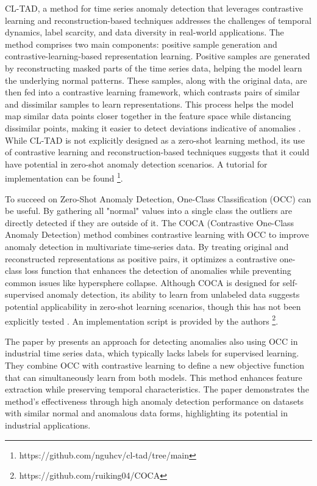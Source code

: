 CL-TAD, a method for time series anomaly detection that leverages contrastive learning and reconstruction-based techniques addresses the challenges of temporal dynamics, label scarcity, and data diversity in real-world applications. The method comprises two main components: positive sample generation and contrastive-learning-based representation learning. Positive samples are generated by reconstructing masked parts of the time series data, helping the model learn the underlying normal patterns. These samples, along with the original data, are then fed into a contrastive learning framework, which contrasts pairs of similar and dissimilar samples to learn representations. This process helps the model map similar data points closer together in the feature space while distancing dissimilar points, making it easier to detect deviations indicative of anomalies \cite{ngu_cl-tad_2023}.
While CL-TAD is not explicitly designed as a zero-shot learning method, its use of contrastive learning and reconstruction-based techniques suggests that it could have potential in zero-shot anomaly detection scenarios. A tutorial for implementation can be found \footnote{\fussy\tiny https://github.com/nguhcv/cl-tad/tree/main}.

To succeed on Zero-Shot Anomaly Detection, One-Class Classification (OCC) can be useful.
By gathering all "normal" values into a single class the outliers are directly detected if they are outside of it.
The COCA (Contrastive One-Class Anomaly Detection) method combines contrastive learning with OCC to improve anomaly detection in multivariate time-series data. By treating original and reconstructed representations as positive pairs, it optimizes a contrastive one-class loss function that enhances the detection of anomalies while preventing common issues like hypersphere collapse. Although COCA is designed for self-supervised anomaly detection, its ability to learn from unlabeled data suggests potential applicability in zero-shot learning scenarios, though this has not been explicitly tested \cite{wang_deep_2023}. An implementation script is provided by the authors \footnote{\fussy\tiny https://github.com/ruiking04/COCA}.

%
The paper by \cite{lee_time_2023} presents an approach for detecting anomalies also using OCC in industrial time series data, which typically lacks labels for supervised learning. They combine OCC with contrastive learning to define a new objective function that can simultaneously learn from both models. This method enhances feature extraction while preserving temporal characteristics. The paper demonstrates the method's effectiveness through high anomaly detection performance on datasets with similar normal and anomalous data forms, highlighting its potential in industrial applications.


